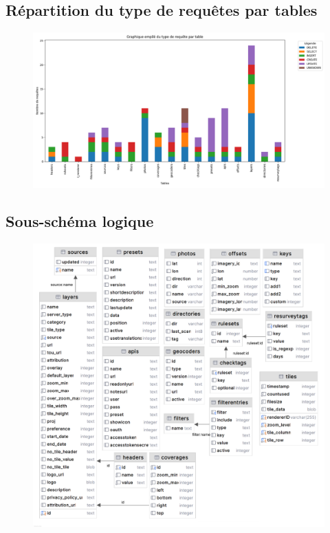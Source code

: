 \subsection{Répartition du type de requêtes par tables}
\begin{figure}[!ht]
    \centering
    \includegraphics[scale=0.4]{images/stats.png}
    \label{fig:Statistiques du nombre de requête par table}
\end{figure}

\newpage
\subsection{Sous-schéma logique}
\begin{figure}[!ht]
    \centering
    \includegraphics[scale=1]{images/sous_schema_logique.png}
    \label{fig:sous schéma logique}
\end{figure}
